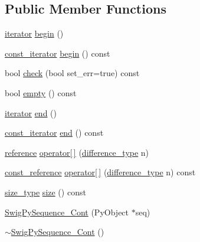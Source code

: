 \subsection*{Public Member Functions}
\begin{DoxyCompactItemize}
\item 
\hyperlink{structswig_1_1_swig_py_sequence___cont_abcd331d0657a109f34c0fd84c5be87dd}{iterator} \hyperlink{structswig_1_1_swig_py_sequence___cont_a6c664b1e10c7f14f8b382e429a25bf18}{begin} ()
\item 
\hyperlink{structswig_1_1_swig_py_sequence___cont_a708a6b3790b68aa53bd79d27a2c16b89}{const\+\_\+iterator} \hyperlink{structswig_1_1_swig_py_sequence___cont_a63b34796bc977555647bed8dd4f50385}{begin} () const
\item 
bool \hyperlink{structswig_1_1_swig_py_sequence___cont_adde81d1400800d54b6a8cd0afd234438}{check} (bool set\+\_\+err=true) const
\item 
bool \hyperlink{structswig_1_1_swig_py_sequence___cont_a57a9fc4c5cb2c2d752c052ee551bc468}{empty} () const
\item 
\hyperlink{structswig_1_1_swig_py_sequence___cont_abcd331d0657a109f34c0fd84c5be87dd}{iterator} \hyperlink{structswig_1_1_swig_py_sequence___cont_afcf903575db45b8119e5039597af9cbb}{end} ()
\item 
\hyperlink{structswig_1_1_swig_py_sequence___cont_a708a6b3790b68aa53bd79d27a2c16b89}{const\+\_\+iterator} \hyperlink{structswig_1_1_swig_py_sequence___cont_a4fe9d3c4879b4a97de2bd4b7d7b59c72}{end} () const
\item 
\hyperlink{structswig_1_1_swig_py_sequence___cont_a4108668900abc99b72844a3a880b3638}{reference} \hyperlink{structswig_1_1_swig_py_sequence___cont_a796a0c43a8a8af5a42f52994b6651960}{operator\mbox{[}$\,$\mbox{]}} (\hyperlink{structswig_1_1_swig_py_sequence___cont_a016875541fce2f04f396da8057a190f9}{difference\+\_\+type} n)
\item 
\hyperlink{structswig_1_1_swig_py_sequence___cont_a9c8d1d3acc0234f3a9cbd570ee7e9cf0}{const\+\_\+reference} \hyperlink{structswig_1_1_swig_py_sequence___cont_a33b8b37c909c48bc894cd9b909d1e81d}{operator\mbox{[}$\,$\mbox{]}} (\hyperlink{structswig_1_1_swig_py_sequence___cont_a016875541fce2f04f396da8057a190f9}{difference\+\_\+type} n) const
\item 
\hyperlink{structswig_1_1_swig_py_sequence___cont_a53e4b21ab9cdd6d0e562ef8a0923cabb}{size\+\_\+type} \hyperlink{structswig_1_1_swig_py_sequence___cont_a8c2d41c6dd056c7fa40a3c4606147e6b}{size} () const
\item 
\hyperlink{structswig_1_1_swig_py_sequence___cont_ab5d9afb935fb3e57c1f0cc41d652ad74}{Swig\+Py\+Sequence\+\_\+\+Cont} (Py\+Object $\ast$seq)
\item 
\hyperlink{structswig_1_1_swig_py_sequence___cont_a6996bb785dd210fa0ec7c35ffcecfe2b}{$\sim$\+Swig\+Py\+Sequence\+\_\+\+Cont} ()
\end{DoxyCompactItemize}



